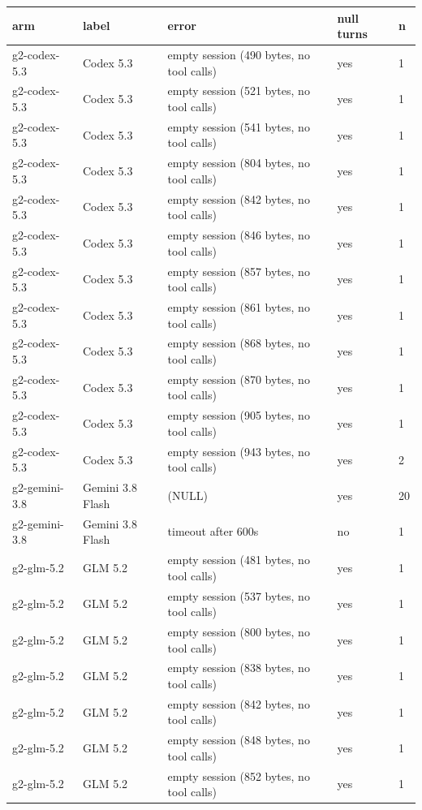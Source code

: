 \begin{tabular}{lllll}
\toprule
arm & label & error & null turns & n \\
\midrule
g2-codex-5.3 & Codex 5.3 & empty session (490 bytes, no tool calls) & yes & 1 \\
g2-codex-5.3 & Codex 5.3 & empty session (521 bytes, no tool calls) & yes & 1 \\
g2-codex-5.3 & Codex 5.3 & empty session (541 bytes, no tool calls) & yes & 1 \\
g2-codex-5.3 & Codex 5.3 & empty session (804 bytes, no tool calls) & yes & 1 \\
g2-codex-5.3 & Codex 5.3 & empty session (842 bytes, no tool calls) & yes & 1 \\
g2-codex-5.3 & Codex 5.3 & empty session (846 bytes, no tool calls) & yes & 1 \\
g2-codex-5.3 & Codex 5.3 & empty session (857 bytes, no tool calls) & yes & 1 \\
g2-codex-5.3 & Codex 5.3 & empty session (861 bytes, no tool calls) & yes & 1 \\
g2-codex-5.3 & Codex 5.3 & empty session (868 bytes, no tool calls) & yes & 1 \\
g2-codex-5.3 & Codex 5.3 & empty session (870 bytes, no tool calls) & yes & 1 \\
g2-codex-5.3 & Codex 5.3 & empty session (905 bytes, no tool calls) & yes & 1 \\
g2-codex-5.3 & Codex 5.3 & empty session (943 bytes, no tool calls) & yes & 2 \\
g2-gemini-3.8 & Gemini 3.8 Flash & (NULL) & yes & 20 \\
g2-gemini-3.8 & Gemini 3.8 Flash & timeout after 600s & no & 1 \\
g2-glm-5.2 & GLM 5.2 & empty session (481 bytes, no tool calls) & yes & 1 \\
g2-glm-5.2 & GLM 5.2 & empty session (537 bytes, no tool calls) & yes & 1 \\
g2-glm-5.2 & GLM 5.2 & empty session (800 bytes, no tool calls) & yes & 1 \\
g2-glm-5.2 & GLM 5.2 & empty session (838 bytes, no tool calls) & yes & 1 \\
g2-glm-5.2 & GLM 5.2 & empty session (842 bytes, no tool calls) & yes & 1 \\
g2-glm-5.2 & GLM 5.2 & empty session (848 bytes, no tool calls) & yes & 1 \\
g2-glm-5.2 & GLM 5.2 & empty session (852 bytes, no tool calls) & yes & 1 \\

\end{tabular}
